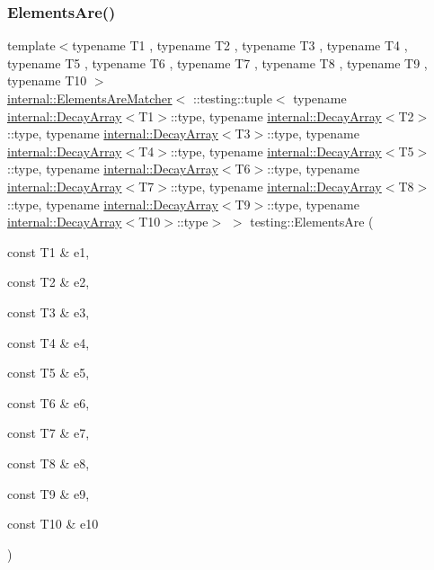 \subsubsection{\texorpdfstring{Elements\+Are()}{ElementsAre()}\hspace{0.1cm}{\footnotesize\ttfamily [11/11]}}
{\footnotesize\ttfamily template$<$typename T1 , typename T2 , typename T3 , typename T4 , typename T5 , typename T6 , typename T7 , typename T8 , typename T9 , typename T10 $>$ \\
\hyperlink{classtesting_1_1internal_1_1_elements_are_matcher}{internal\+::\+Elements\+Are\+Matcher}$<$ \+::testing\+::tuple$<$ typename \hyperlink{structtesting_1_1internal_1_1_decay_array}{internal\+::\+Decay\+Array}$<$T1$>$\+::type, typename \hyperlink{structtesting_1_1internal_1_1_decay_array}{internal\+::\+Decay\+Array}$<$T2$>$\+::type, typename \hyperlink{structtesting_1_1internal_1_1_decay_array}{internal\+::\+Decay\+Array}$<$T3$>$\+::type, typename \hyperlink{structtesting_1_1internal_1_1_decay_array}{internal\+::\+Decay\+Array}$<$T4$>$\+::type, typename \hyperlink{structtesting_1_1internal_1_1_decay_array}{internal\+::\+Decay\+Array}$<$T5$>$\+::type, typename \hyperlink{structtesting_1_1internal_1_1_decay_array}{internal\+::\+Decay\+Array}$<$T6$>$\+::type, typename \hyperlink{structtesting_1_1internal_1_1_decay_array}{internal\+::\+Decay\+Array}$<$T7$>$\+::type, typename \hyperlink{structtesting_1_1internal_1_1_decay_array}{internal\+::\+Decay\+Array}$<$T8$>$\+::type, typename \hyperlink{structtesting_1_1internal_1_1_decay_array}{internal\+::\+Decay\+Array}$<$T9$>$\+::type, typename \hyperlink{structtesting_1_1internal_1_1_decay_array}{internal\+::\+Decay\+Array}$<$T10$>$\+::type$>$ $>$ testing\+::\+Elements\+Are (\begin{DoxyParamCaption}\item[{const T1 \&}]{e1,  }\item[{const T2 \&}]{e2,  }\item[{const T3 \&}]{e3,  }\item[{const T4 \&}]{e4,  }\item[{const T5 \&}]{e5,  }\item[{const T6 \&}]{e6,  }\item[{const T7 \&}]{e7,  }\item[{const T8 \&}]{e8,  }\item[{const T9 \&}]{e9,  }\item[{const T10 \&}]{e10 }\end{DoxyParamCaption})\hspace{0.3cm}{\ttfamily [inline]}}

